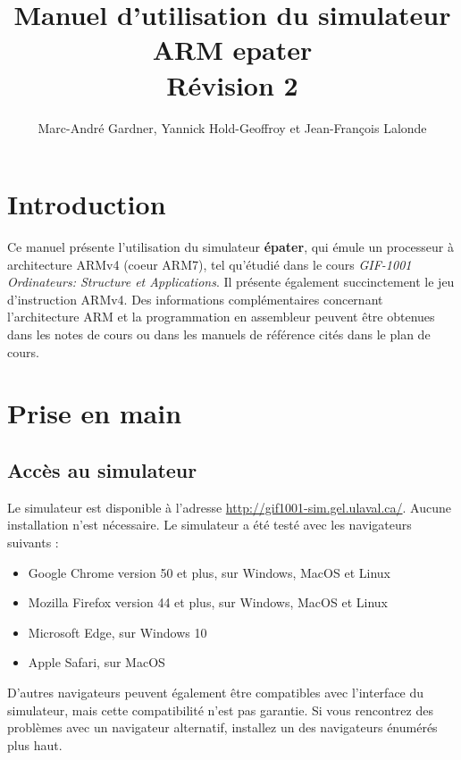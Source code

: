 \documentclass{tufte-handout}
\title{Manuel d'utilisation du simulateur ARM epater\\Révision 2}
\author{Marc-André Gardner, Yannick Hold-Geoffroy et Jean-François Lalonde}
\begin{document}
\maketitle%

\section{Introduction}

Ce manuel présente l'utilisation du simulateur \textbf{épater}, qui émule un processeur à architecture ARMv4 (coeur ARM7), tel qu'étudié dans le cours \textit{GIF-1001 Ordinateurs: Structure et Applications}. Il présente également succinctement le jeu d'instruction ARMv4. Des informations complémentaires concernant l'architecture ARM et la programmation en assembleur peuvent être obtenues dans les notes de cours ou dans les manuels de référence cités dans le plan de cours.

\section{Prise en main}

\subsection{Accès au simulateur}

Le simulateur est disponible à l'adresse \url{http://gif1001-sim.gel.ulaval.ca/}. Aucune installation n'est nécessaire. Le simulateur a été testé avec les navigateurs suivants :
\begin{itemize}
	\item Google Chrome version 50 et plus, sur Windows, MacOS et Linux
	\item Mozilla Firefox version 44 et plus, sur Windows, MacOS et Linux
	\item Microsoft Edge, sur Windows 10
	\item Apple Safari, sur MacOS
\end{itemize}

D'autres navigateurs peuvent également être compatibles avec l'interface du simulateur, mais cette compatibilité n'est pas garantie. Si vous rencontrez des problèmes avec un navigateur alternatif, installez un des navigateurs énumérés plus haut.


\paragraph{\textbf{\color{red}{Note importante :}}} {}
\end{document}
